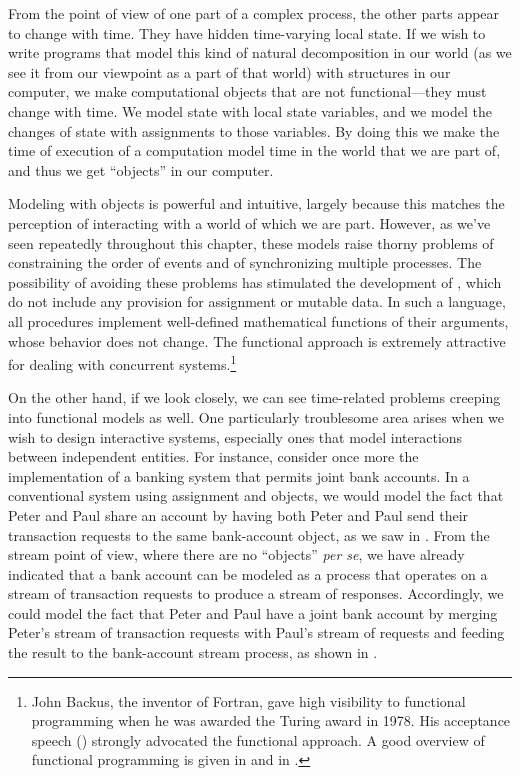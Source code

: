 From the point of view of one part of a complex process, the other parts appear
to change with time.  They have hidden time-varying local state.  If we wish to
write programs that model this kind of natural decomposition in our world (as
we see it from our viewpoint as a part of that world) with structures in our
computer, we make computational objects that are not functional---they must
change with time.  We model state with local state variables, and we model the
changes of state with assignments to those variables.  By doing this we make
the time of execution of a computation model time in the world that we are part
of, and thus we get ``objects'' in our computer.

Modeling with objects is powerful and intuitive, largely because this matches
the perception of interacting with a world of which we are part.  However, as
we've seen repeatedly throughout this chapter, these models raise thorny
problems of constraining the order of events and of synchronizing multiple
processes.  The possibility of avoiding these problems has stimulated the
development of , which do not include
any provision for assignment or mutable data.  In such a language, all
procedures implement well-defined mathematical functions of their arguments,
whose behavior does not change.  The functional approach is extremely
attractive for dealing with concurrent systems.\footnote{John Backus, the
inventor of Fortran, gave high visibility to functional programming when he was
awarded the  Turing award in 1978.  His acceptance speech
() strongly advocated the functional approach.  A good overview of
functional programming is given in  and in
.}

On the other hand, if we look closely, we can see time-related problems
creeping into functional models as well.  One particularly troublesome area
arises when we wish to design interactive systems, especially ones that model
interactions between independent entities.  For instance, consider once more
the implementation of a banking system that permits joint bank accounts.  In a
conventional system using assignment and objects, we would model the fact that
Peter and Paul share an account by having both Peter and Paul send their
transaction requests to the same bank-account object, as we saw in
.  From the stream point of view, where there are no ``objects''
\emph{per se}, we have already indicated that a bank account can be modeled as
a process that operates on a stream of transaction requests to produce a stream
of responses.  Accordingly, we could model the fact that Peter and Paul have a
joint bank account by merging Peter's stream of transaction requests with
Paul's stream of requests and feeding the result to the bank-account stream
process, as shown in .

